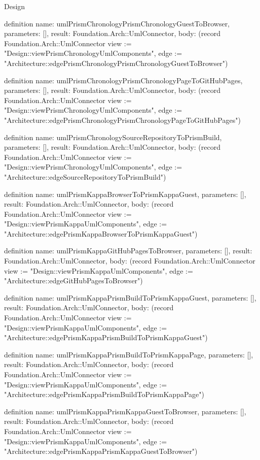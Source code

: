 \begin{lexlean}{Design}
\begin{semanticmodule}
definition{
  name: umlPrismChronologyPrismChronologyGuestToBrowser,
  parameters: [],
  result: Foundation.Arch::UmlConnector,
  body: (record Foundation.Arch::UmlConnector {view := "Design::viewPrismChronologyUmlComponents", edge := "Architecture::edgePrismChronologyPrismChronologyGuestToBrowser"})
}

definition{
  name: umlPrismChronologyPrismChronologyPageToGitHubPages,
  parameters: [],
  result: Foundation.Arch::UmlConnector,
  body: (record Foundation.Arch::UmlConnector {view := "Design::viewPrismChronologyUmlComponents", edge := "Architecture::edgePrismChronologyPrismChronologyPageToGitHubPages"})
}

definition{
  name: umlPrismChronologySourceRepositoryToPrismBuild,
  parameters: [],
  result: Foundation.Arch::UmlConnector,
  body: (record Foundation.Arch::UmlConnector {view := "Design::viewPrismChronologyUmlComponents", edge := "Architecture::edgeSourceRepositoryToPrismBuild"})
}

definition{
  name: umlPrismKappaBrowserToPrismKappaGuest,
  parameters: [],
  result: Foundation.Arch::UmlConnector,
  body: (record Foundation.Arch::UmlConnector {view := "Design::viewPrismKappaUmlComponents", edge := "Architecture::edgePrismKappaBrowserToPrismKappaGuest"})
}

definition{
  name: umlPrismKappaGitHubPagesToBrowser,
  parameters: [],
  result: Foundation.Arch::UmlConnector,
  body: (record Foundation.Arch::UmlConnector {view := "Design::viewPrismKappaUmlComponents", edge := "Architecture::edgeGitHubPagesToBrowser"})
}

definition{
  name: umlPrismKappaPrismBuildToPrismKappaGuest,
  parameters: [],
  result: Foundation.Arch::UmlConnector,
  body: (record Foundation.Arch::UmlConnector {view := "Design::viewPrismKappaUmlComponents", edge := "Architecture::edgePrismKappaPrismBuildToPrismKappaGuest"})
}

definition{
  name: umlPrismKappaPrismBuildToPrismKappaPage,
  parameters: [],
  result: Foundation.Arch::UmlConnector,
  body: (record Foundation.Arch::UmlConnector {view := "Design::viewPrismKappaUmlComponents", edge := "Architecture::edgePrismKappaPrismBuildToPrismKappaPage"})
}

definition{
  name: umlPrismKappaPrismKappaGuestToBrowser,
  parameters: [],
  result: Foundation.Arch::UmlConnector,
  body: (record Foundation.Arch::UmlConnector {view := "Design::viewPrismKappaUmlComponents", edge := "Architecture::edgePrismKappaPrismKappaGuestToBrowser"})
}


\end{semanticmodule}
\end{lexlean}
